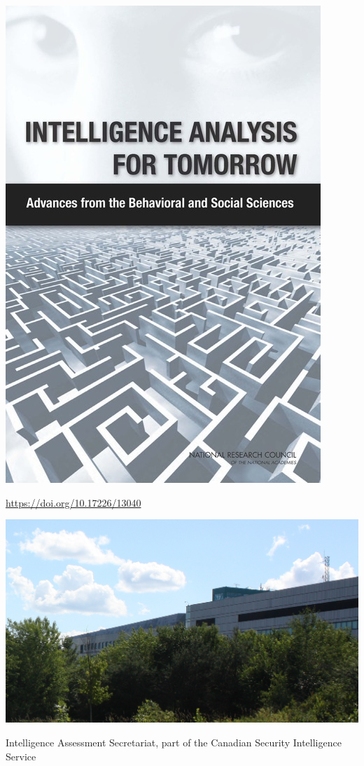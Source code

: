 \documentclass[aspectratio=169]{beamer}
\begin{document}
\begin{frame}

\begin{center}
\includegraphics[height=0.7\textheight]{figures/nas_intellegence_2011_cover}
\end{center}

\vfill
\url{https://doi.org/10.17226/13040}

\end{frame}
\begin{frame}

\begin{center}
\includegraphics[width=\textwidth]{figures/CSIS_Ottawa_Building_Ogilvie_Canadian_Security_Intelligence_Service_(50182903412)}
\end{center}

\vfill
Intelligence Assessment Secretariat, part of the Canadian Security Intelligence Service
\end{frame}
\end{document}
